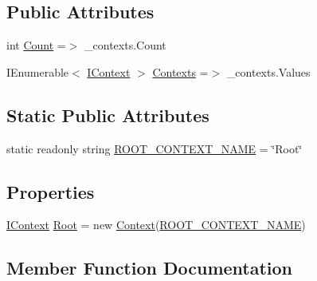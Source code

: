 \subsection*{Public Attributes}
\begin{DoxyCompactItemize}
\item 
int \mbox{\hyperlink{classcp_games_1_1core_1_1_rapid_m_v_c_1_1impl_1_1_context_collection_a603190e767ea71b70e6d75435d5aaca1}{Count}} =$>$ \+\_\+contexts.\+Count
\item 
I\+Enumerable$<$ \mbox{\hyperlink{interfacecp_games_1_1core_1_1_rapid_m_v_c_1_1_i_context}{I\+Context}} $>$ \mbox{\hyperlink{classcp_games_1_1core_1_1_rapid_m_v_c_1_1impl_1_1_context_collection_a461c959ddb4568cfb21d2ebc61f4f832}{Contexts}} =$>$ \+\_\+contexts.\+Values
\end{DoxyCompactItemize}
\subsection*{Static Public Attributes}
\begin{DoxyCompactItemize}
\item 
static readonly string \mbox{\hyperlink{classcp_games_1_1core_1_1_rapid_m_v_c_1_1impl_1_1_context_collection_a86300874483a67e28fba243d52f6e05a}{R\+O\+O\+T\+\_\+\+C\+O\+N\+T\+E\+X\+T\+\_\+\+N\+A\+ME}} = \char`\"{}Root\char`\"{}
\end{DoxyCompactItemize}
\subsection*{Properties}
\begin{DoxyCompactItemize}
\item 
\mbox{\hyperlink{interfacecp_games_1_1core_1_1_rapid_m_v_c_1_1_i_context}{I\+Context}} \mbox{\hyperlink{classcp_games_1_1core_1_1_rapid_m_v_c_1_1impl_1_1_context_collection_aa7ccaf9a5b00706a684a475c21928560}{Root}} = new \mbox{\hyperlink{classcp_games_1_1core_1_1_rapid_m_v_c_1_1impl_1_1_context}{Context}}(\mbox{\hyperlink{classcp_games_1_1core_1_1_rapid_m_v_c_1_1impl_1_1_context_collection_a86300874483a67e28fba243d52f6e05a}{R\+O\+O\+T\+\_\+\+C\+O\+N\+T\+E\+X\+T\+\_\+\+N\+A\+ME}})
\end{DoxyCompactItemize}


\subsection{Member Function Documentation}
\mbox{\label{classcp_games_1_1core_1_1_rapid_m_v_c_1_1impl_1_1_context_collection_a288b7ee5d4388b498e8b213694761b4a}} 
